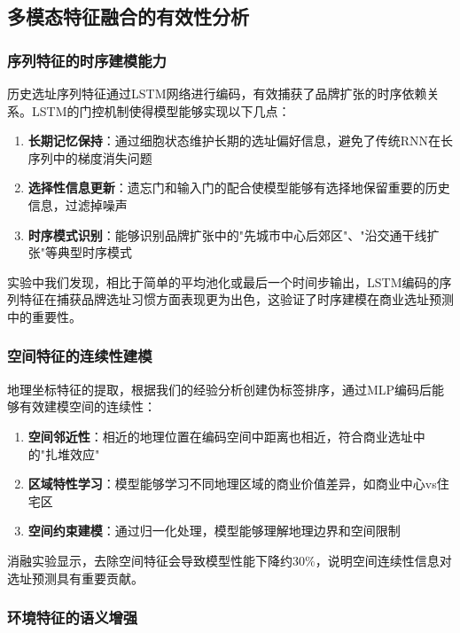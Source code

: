 \documentclass{article}
\begin{document}
\subsection{多模态特征融合的有效性分析}

\subsubsection{序列特征的时序建模能力}

历史选址序列特征通过LSTM网络进行编码，有效捕获了品牌扩张的时序依赖关系。LSTM的门控机制使得模型能够实现以下几点：

\begin{enumerate}
\item \textbf{长期记忆保持}：通过细胞状态维护长期的选址偏好信息，避免了传统RNN在长序列中的梯度消失问题
\item \textbf{选择性信息更新}：遗忘门和输入门的配合使模型能够有选择地保留重要的历史信息，过滤掉噪声
\item \textbf{时序模式识别}：能够识别品牌扩张中的"先城市中心后郊区"、"沿交通干线扩张"等典型时序模式
\end{enumerate}

实验中我们发现，相比于简单的平均池化或最后一个时间步输出，LSTM编码的序列特征在捕获品牌选址习惯方面表现更为出色，这验证了时序建模在商业选址预测中的重要性。

\subsubsection{空间特征的连续性建模}

地理坐标特征的提取，根据我们的经验分析创建伪标签排序，通过MLP编码后能够有效建模空间的连续性：

\begin{enumerate}
\item \textbf{空间邻近性}：相近的地理位置在编码空间中距离也相近，符合商业选址中的"扎堆效应"
\item \textbf{区域特性学习}：模型能够学习不同地理区域的商业价值差异，如商业中心vs住宅区
\item \textbf{空间约束建模}：通过归一化处理，模型能够理解地理边界和空间限制
\end{enumerate}

消融实验显示，去除空间特征会导致模型性能下降约30\%，说明空间连续性信息对选址预测具有重要贡献。

\subsubsection{环境特征的语义增强}
\end{document}
